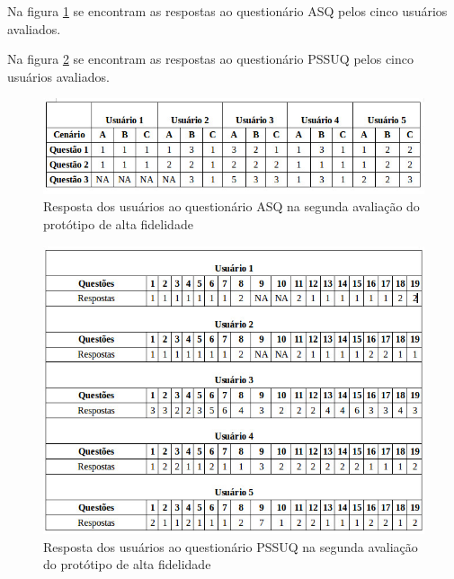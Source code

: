   
  Na figura \ref{asqalta_2} se encontram as respostas ao questionário ASQ pelos cinco usuários avaliados.
  
  Na figura \ref{pssuqalta_2} se encontram as respostas ao questionário PSSUQ pelos cinco usuários avaliados.
  
  \begin{figure}[!htb]
  \centering
  \includegraphics[scale=0.6]{figuras/asqalta_2.jpg}
  \caption{Resposta dos usuários ao questionário ASQ na segunda avaliação do protótipo de alta fidelidade}
  \label{asqalta_2}
  \end{figure}
   
  
  \begin{figure}[!htb]
  \centering
  \includegraphics[scale=0.6]{figuras/pssuqalta_2.jpg}
  \caption{Resposta dos usuários ao questionário PSSUQ na segunda avaliação do protótipo de alta fidelidade}
  \label{pssuqalta_2}
  \end{figure}  